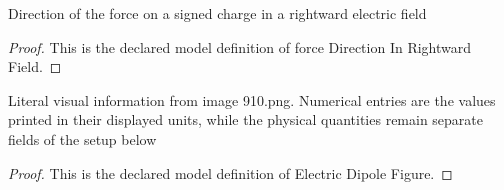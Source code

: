 \begin{definition}
  \label{def:physics:phyx-mini-0910:phyxminiproblems-problemphyxmini0910-forcedirectioninrightwardfield}
  Direction of the force on a signed charge in a rightward electric field
\end{definition}
\begin{proof}
  This is the declared model definition of force Direction In Rightward Field.
\end{proof}
\begin{definition}
  \label{def:physics:phyx-mini-0910:phyxminiproblems-problemphyxmini0910-electricdipolefigure}
  Literal visual information from image 910.png. Numerical entries are the values printed in their displayed units, while the physical quantities remain separate fields of the setup below
\end{definition}
\begin{proof}
  This is the declared model definition of Electric Dipole Figure.
\end{proof}
